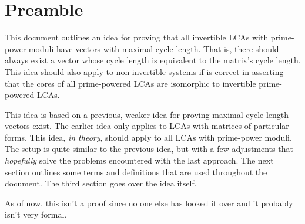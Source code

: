 \documentclass[a4paper, reqno, 12pt]{amsart}
\begin{document}
	\section{Preamble}
		This document outlines an idea for proving that all invertible LCAs with prime-power moduli have vectors with maximal cycle length. That is, there should 
		always exist a vector whose cycle length is equivalent to the matrix's cycle length. This idea should also apply to non-invertible systems if 
		\citet{Strong2022core} is correct in asserting that the cores of all prime-powered LCAs are isomorphic to invertible prime-powered LCAs. 
		
		This idea is based on a previous, weaker idea for proving maximal cycle length vectors exist. The earlier idea only applies to LCAs with matrices of 
		particular forms. This idea, \emph{in theory}, should apply to all LCAs with prime-power moduli. The setup is quite similar to the previous idea, but with a 
		few adjustments that \emph{hopefully} solve the problems encountered with the last approach.
		The next section outlines some terms and definitions that are used throughout the document. The third section goes over the idea itself. 
		
		As of now, this isn't a proof since no one else has looked it over and it probably isn't very formal.
		
\end{document}
